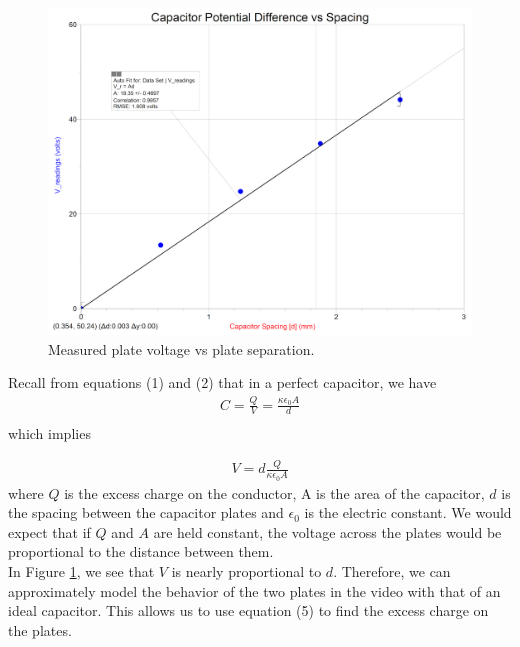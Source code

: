 \documentclass[oneside,12pt]{amsart}
\begin{document}
\begin{figure}[H]
	\includegraphics[width=\medgraph,scale=0.01]{VoltvDistance.png}
	\caption{Measured plate voltage vs plate separation.}
	\label{VvD}
\end{figure}

	\indent Recall from equations (1) and (2) that in a perfect capacitor, we have 
	\begin{align*}
	C = \frac{Q}{V} =  \frac{\kappa \epsilon _{0}A}{d}\\
	\end{align*}
	which implies
	
	\begin{align}
	V = d\frac{Q}{\kappa\epsilon_0A}
	\end{align}
	 where $Q$ is the excess charge on the conductor, A is the area of the capacitor, $d$ is the spacing between the capacitor plates and $\epsilon_0$ is the electric constant. We would expect that if $Q$ and $A$ are held constant, the voltage across the plates would be proportional to the distance between them.\\
	 
	 \indent In Figure \ref{VvD}, we see that $V$ is nearly proportional to $d$. Therefore, we can approximately model the behavior of the two plates in the video with that of an ideal capacitor. This allows us to use equation (5) to find the excess charge on the plates.\\
	 
\end{document}
